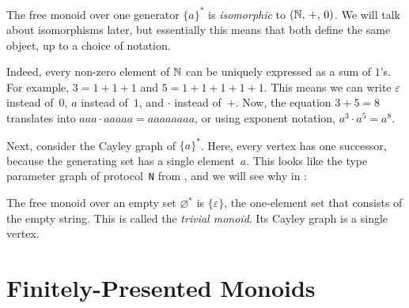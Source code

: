 \documentclass[../generics]{subfiles}
\begin{document}
\begin{example}\label{monoid n graph}
The free monoid over one generator $\{a\}^*$ is \emph{isomorphic} to $(\mathbb{N},\,+,\,0)$. We will talk about isomorphisms later, but essentially this means that both define the same object, up to a choice of notation.

Indeed, every non-zero element of $\mathbb{N}$ can be uniquely expressed as a sum of $1$'s. For example, $3=1+1+1$ and $5=1+1+1+1+1$. This means we can write $\varepsilon$ instead of~$0$, $a$ instead of~$1$, and $\cdot$ instead of~$+$. Now, the equation $3+5=8$ translates into $aaa\cdot aaaaa=aaaaaaaa$, or using exponent notation, $a^3\cdot a^5 = a^8$.

Next, consider the Cayley graph of $\{a\}^*$. Here, every vertex has one successor, because the generating set has a single element~$a$. This looks like the type parameter graph of protocol~\texttt{N} from , and we will see why in :

\begin{center}
\end{center}
\end{example}

\begin{example}
The free monoid over an empty set $\varnothing^*$ is $\{\varepsilon\}$, the one-element set that consists of the empty string. This is called the \emph{trivial monoid}. Its Cayley graph is a single vertex.
\end{example}

\section{Finitely-Presented Monoids}\label{finitely presented monoids}
\end{document}
